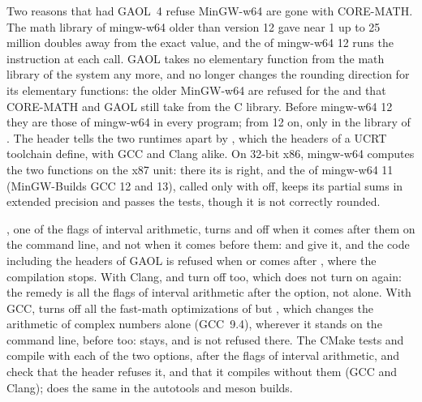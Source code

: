 \documentclass[12pt,a4paper,twoside,openright]{book}
\begin{document}
\begin{Rem}
Two reasons that had GAOL~4 refuse MinGW-w64 are gone with
CORE-MATH.\newinvfive{} The math library of mingw-w64 older than version 12
gave  near 1 up to 25 million doubles away from the exact
value, and the  of mingw-w64 12 runs the instruction
 at each call. GAOL takes no elementary function from the math
library of the system any more, and no longer changes the rounding direction
for its elementary functions: the older MinGW-w64 are refused for the
 and  that CORE-MATH and GAOL still take from the C
library. Before mingw-w64 12 they are those of mingw-w64 in every program;
from 12 on, only in the library of . The header
 tells the two runtimes apart by ,
which the headers of a UCRT toolchain define, with GCC and Clang alike. On
32-bit x86, mingw-w64 computes the two functions on the x87 unit: there its
 is right, and the  of mingw-w64 11 (MinGW-Builds
GCC 12 and 13), called only with  off, keeps its partial
sums in extended precision and passes the tests, though it is not correctly
rounded.
\end{Rem}

\medskip
{}, one of the flags of interval arithmetic, turns
 and  off when it comes after
them on the command line, and not when it comes before them: 
and  give it, and the code including the headers of GAOL is
refused when  or  comes after
, where the compilation stops. With Clang,
 and  turn  off
too, which  does not turn on again: the remedy is all
the flags of interval arithmetic after the option, not 
alone. With GCC,  turns off all the fast-math
optimizations of  but , which
changes the arithmetic of complex numbers alone (GCC~9.4), wherever it stands
on the command line, before  too: 
stays, and  is not refused there. The CMake tests
 and  compile
 with each of the two options, after the
flags of interval arithmetic, and check that the header refuses it, and
 that it compiles without them (GCC and Clang);
 does the same in the autotools and meson
builds.
\end{document}
